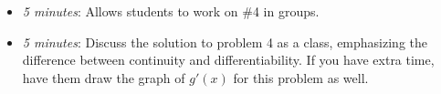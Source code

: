 \documentclass[handout,nooutcomes]{ximera}
\begin{document}
	\begin{itemize}
	
	\item \emph{5 minutes}:  Allows students to work on \#4 in groups. 
	
	\item \emph{5 minutes}:  Discuss the solution to problem 4 as a class, emphasizing the difference between continuity and differentiability.  If you have extra time, have them draw the graph of $g'(x)$ for this problem as well.	
	\end{itemize}	
	
	

	
	
	

	
	
	
\end{document}
